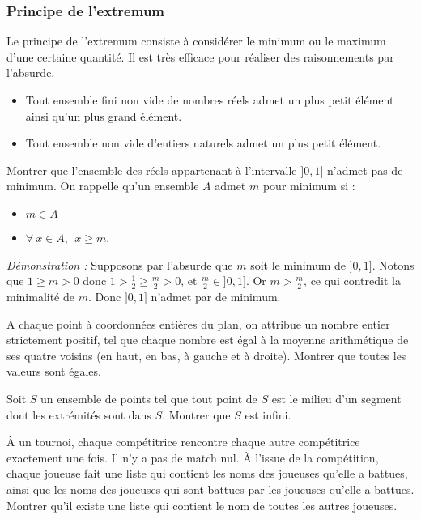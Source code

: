 \subsubsection{Principe de l'extremum}
Le principe de l'extremum consiste à considérer le minimum ou le maximum d’une certaine quantité. Il est très efficace pour réaliser des raisonnements par l’absurde.

\begin{thm}
\begin{itemize}
    \item Tout ensemble fini non vide de nombres réels admet un plus petit élément ainsi qu’un plus grand élément.
    \item Tout ensemble non vide d'entiers naturels admet un plus petit élément.
\end{itemize}
\end{thm}


\begin{ex}
Montrer que l'ensemble des réels appartenant à l'intervalle $]0,1]$ n'admet pas de minimum. \newline
On rappelle qu'un ensemble $A$ admet $m$ pour minimum si : 
\begin{itemize}
\item $m\in A$
\item $\forall~ x\in A, ~~ x\geq m$.
\end{itemize}
\bigskip
\noindent\textit{Démonstration :} Supposons par l'absurde que $m$ soit le minimum de $]0,1]$. \newline
Notons que $1\geq m>0$ donc $1>\frac12\geq\frac{m}{2}>0$, et $\frac{m}{2}\in]0,1]$. Or $m>\frac{m}{2}$, ce qui contredit la minimalité de $m$. Donc $]0,1]$ n'admet par de minimum.
\end{ex}


\begin{exo}
A chaque point à coordonnées entières du plan, on attribue un nombre entier strictement positif, tel que chaque nombre est égal à la moyenne arithmétique de ses quatre voisins
(en haut, en bas, à gauche et à droite). Montrer que toutes les valeurs sont égales. 
\end{exo}


\begin{exo}
Soit $S$ un ensemble de points tel que tout point de $S$ est le milieu d’un segment dont les extrémités sont dans $S$. Montrer que $S$ est infini.
\end{exo}


\begin{exo}
À un tournoi, chaque compétitrice rencontre chaque autre compétitrice exactement une fois. Il n’y a pas de match nul. À l’issue de la compétition, chaque joueuse fait une liste qui contient les noms des joueuses qu’elle a battues, ainsi que les noms des joueuses qui sont battues par les joueuses qu’elle a battues.
\newline
Montrer qu’il existe une liste qui contient le nom de toutes les autres joueuses.
\end{exo}

